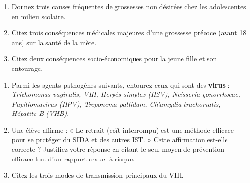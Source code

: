 \documentclass[11pt]{article}
\begin{document}
\begin{exercice}
\begin{enumerate}
    \item Donnez trois causes fréquentes de grossesses non désirées chez les adolescentes en milieu scolaire.
    \item Citez trois conséquences médicales majeures d'une grossesse précoce (avant 18 ans) sur la santé de la mère.
    \item Citez deux conséquences socio-économiques pour la jeune fille et son entourage.
\end{enumerate}
\end{exercice}

\begin{exercice}
\begin{enumerate}
    \item Parmi les agents pathogènes suivants, entourez ceux qui sont des \textbf{virus} : \textit{Trichomonas vaginalis, VIH, Herpès simplex (HSV), Neisseria gonorrhoeae, Papillomavirus (HPV), Treponema pallidum, Chlamydia trachomatis, Hépatite B (VHB)}.
    \item Une élève affirme : « Le retrait (coït interrompu) est une méthode efficace pour se protéger du SIDA et des autres IST. » Cette affirmation est-elle correcte ? Justifiez votre réponse en citant le seul moyen de prévention efficace lors d'un rapport sexuel à risque.
    \item Citez les trois modes de transmission principaux du VIH.
\end{enumerate}
\end{exercice}
\end{document}
